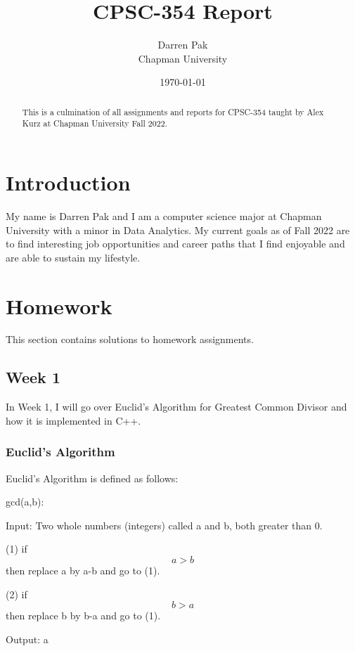 \documentclass{article}
\title{CPSC-354 Report}
\author{Darren Pak  \\ Chapman University}
\date{\today}
\theoremstyle{theorem}
\theoremstyle{definition}
\theoremstyle{remark}
\begin{document}
\maketitle

\begin{abstract}
This is a culmination of all assignments and reports for CPSC-354 taught by Alex Kurz at Chapman University Fall 2022. 
\end{abstract}

\tableofcontents

\section{Introduction}\label{intro}

My name is Darren Pak and I am a computer science major at Chapman University with a minor in Data Analytics. My current goals as of Fall 2022 are to find interesting job opportunities and career paths that I find enjoyable and are able to sustain my lifestyle. 

\section{Homework}\label{homework}

This section contains solutions to homework assignments. 

\subsection{Week 1}

In Week 1, I will go over Euclid's Algorithm for Greatest Common Divisor and how it is implemented in C++.

\subsubsection{Euclid's Algorithm}

Euclid's Algorithm is defined as follows:

\medskip\noindent 
gcd(a,b):

\medskip\noindent 
Input: Two whole numbers (integers) called a and b, both greater than 0.

\medskip\noindent 
(1) if $$a > b$$ then replace a by a-b and go to (1).

\medskip\noindent 
(2) if $$b > a$$ then replace b by b-a and go to (1).

\medskip\noindent 
Output: a
\end{document}
